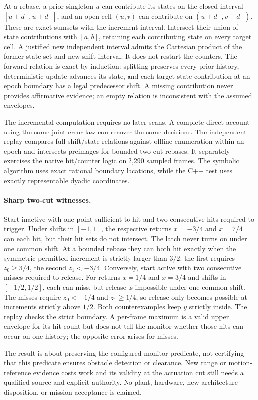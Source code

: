 \documentclass[11pt]{article}
\begin{document}
At a rebase, a prior singleton $u$ can contribute its states on the
closed interval $[u+d_-,u+d_+]$, and an open cell $(u,v)$ can contribute
on $(u+d_-,v+d_+)$. These are exact sumsets with the increment interval.
Intersect their union of state contributions with $[a,b]$, retaining
each contributing state on every target cell. A justified new
independent interval admits the Cartesian product of the former
state set and new shift interval. It does not restart the counters.
The forward relation is exact by induction: splitting preserves every
prior history, deterministic update advances its state, and each
target-state contribution at an epoch boundary has a legal predecessor
shift. A missing contribution never provides affirmative evidence;
an empty relation is inconsistent with the assumed envelopes.

The incremental computation requires no later scans. A complete
direct account using the same joint error law can recover the
same decisions. The independent replay compares full shift/state
relations against offline enumeration within an epoch and intersects
preimages for bounded two-cut rebases. It separately exercises the
native hit/counter logic on 2{,}290 sampled frames. The symbolic
algorithm uses exact rational boundary locations, while the C++
test uses exactly representable dyadic coordinates.

\paragraph{Sharp two-cut witnesses.}
Start inactive with one point sufficient to hit and two consecutive
hits required to trigger. Under shifts in $[-1,1]$, the respective
returns $x=-3/4$ and $x=7/4$ can each hit, but their hit sets do not
intersect. The latch never turns on under one common shift. At a
bounded rebase they can both hit exactly when the symmetric permitted
increment is strictly larger than $3/2$: the first requires
$z_0\ge3/4$, the second $z_1<-3/4$.
Conversely, start active with two consecutive misses required to
release. For returns $x=1/4$ and $x=3/4$ and shifts in
$[-1/2,1/2]$, each can miss, but release is impossible under one
common shift. The misses require $z_0<-1/4$ and $z_1\ge1/4$,
so release only becomes possible at increments strictly above $1/2$.
Both counterexamples keep $y$ strictly inside. The replay checks
the strict boundary. A per-frame maximum is a valid upper envelope
for its hit count but does not tell the monitor whether those hits
can occur on one history; the opposite error arises for misses.

The result is about preserving the configured monitor predicate, not
certifying that this predicate ensures obstacle detection or clearance.
New range or motion-reference evidence costs work and its validity at
the actuation cut still needs a qualified source and explicit authority.
No plant, hardware, new architecture disposition, or mission acceptance
is claimed.
\end{document}
